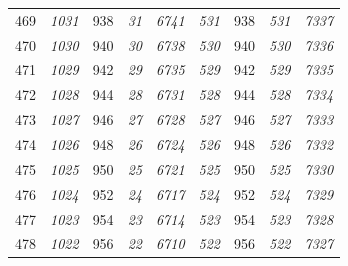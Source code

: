 \documentclass[10pt,fleqn]{article}
\begin{document}
\begin{longtable}{c|cccccccc}
469 & {\color{blue} \it 1031 \rm} & {\color{black} 938} & {\color{blue} \it 31 \rm} & {\color{blue} \it 6741 \rm} & {\color{blue} \it 531 \rm} & {\color{black} 938} & {\color{blue} \it 531 \rm} & {\color{blue} \it 7337 \rm} \\
470 & {\color{blue} \it 1030 \rm} & {\color{black} 940} & {\color{blue} \it 30 \rm} & {\color{blue} \it 6738 \rm} & {\color{blue} \it 530 \rm} & {\color{black} 940} & {\color{blue} \it 530 \rm} & {\color{blue} \it 7336 \rm} \\
471 & {\color{blue} \it 1029 \rm} & {\color{black} 942} & {\color{blue} \it 29 \rm} & {\color{blue} \it 6735 \rm} & {\color{blue} \it 529 \rm} & {\color{black} 942} & {\color{blue} \it 529 \rm} & {\color{blue} \it 7335 \rm} \\
472 & {\color{blue} \it 1028 \rm} & {\color{black} 944} & {\color{blue} \it 28 \rm} & {\color{blue} \it 6731 \rm} & {\color{blue} \it 528 \rm} & {\color{black} 944} & {\color{blue} \it 528 \rm} & {\color{blue} \it 7334 \rm} \\
473 & {\color{blue} \it 1027 \rm} & {\color{black} 946} & {\color{blue} \it 27 \rm} & {\color{blue} \it 6728 \rm} & {\color{blue} \it 527 \rm} & {\color{black} 946} & {\color{blue} \it 527 \rm} & {\color{blue} \it 7333 \rm} \\
474 & {\color{blue} \it 1026 \rm} & {\color{black} 948} & {\color{blue} \it 26 \rm} & {\color{blue} \it 6724 \rm} & {\color{blue} \it 526 \rm} & {\color{black} 948} & {\color{blue} \it 526 \rm} & {\color{blue} \it 7332 \rm} \\
475 & {\color{blue} \it 1025 \rm} & {\color{black} 950} & {\color{blue} \it 25 \rm} & {\color{blue} \it 6721 \rm} & {\color{blue} \it 525 \rm} & {\color{black} 950} & {\color{blue} \it 525 \rm} & {\color{blue} \it 7330 \rm} \\
476 & {\color{blue} \it 1024 \rm} & {\color{black} 952} & {\color{blue} \it 24 \rm} & {\color{blue} \it 6717 \rm} & {\color{blue} \it 524 \rm} & {\color{black} 952} & {\color{blue} \it 524 \rm} & {\color{blue} \it 7329 \rm} \\
477 & {\color{blue} \it 1023 \rm} & {\color{black} 954} & {\color{blue} \it 23 \rm} & {\color{blue} \it 6714 \rm} & {\color{blue} \it 523 \rm} & {\color{black} 954} & {\color{blue} \it 523 \rm} & {\color{blue} \it 7328 \rm} \\
478 & {\color{blue} \it 1022 \rm} & {\color{black} 956} & {\color{blue} \it 22 \rm} & {\color{blue} \it 6710 \rm} & {\color{blue} \it 522 \rm} & {\color{black} 956} & {\color{blue} \it 522 \rm} & {\color{blue} \it 7327 \rm} \\

\end{longtable}
\end{document}
